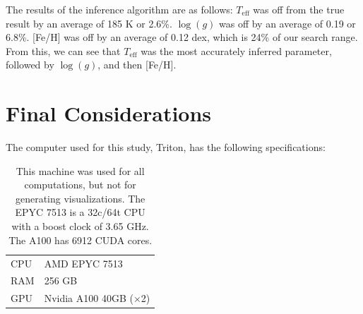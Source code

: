 \documentclass[twocolumn]{aastex631}
\begin{document}
The results of the inference algorithm are as follows: $T_{\mathrm{eff}}$ was off from the true result by an average of 185 K or 2.6\%. 
$\log(g)$ was off by an average of 0.19 or 6.8\%. [Fe/H] was off by an average of 0.12 dex, which is 24\% of our search range.
From this, we can see that $T_{\mathrm{eff}}$ was the most accurately inferred parameter, followed by $\log(g)$, and then [Fe/H].

\section{Final Considerations}
The computer used for this study, Triton, has the following specifications:
\begin{table}[h!]
    \centering
    \begin{tabular}{ll}
        \hline
        CPU & AMD EPYC 7513\\
        RAM & 256 GB\\
        GPU & Nvidia A100 40GB ($\times$2)\\
        \hline
    \end{tabular}
    \caption{This machine was used for all computations, but not for generating visualizations. The EPYC 7513 is a 32c/64t CPU with a boost clock of 3.65 GHz. The A100 has 6912 CUDA cores.}
\end{table}
\end{document}
